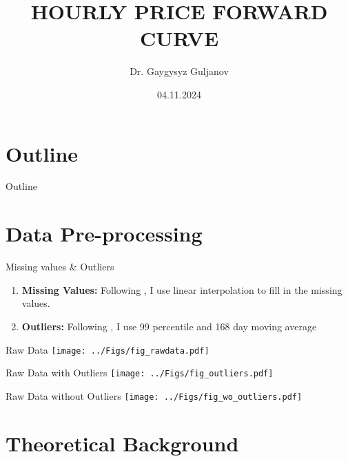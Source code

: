 \documentclass{beamer}
\title{\fontsize{12pt}{15pt} \selectfont HOURLY PRICE FORWARD CURVE}
\author{Dr. Gaygysyz Guljanov}
\institute{University of Münster}
\date{04.11.2024}
\begin{document}
\frame{\titlepage}

\section{Outline}

\begin{frame}{Outline}
    \tableofcontents
\end{frame}


\section{Data Pre-processing}

\begin{frame}{Missing values \& Outliers}
    \begin{enumerate}
        \item \textbf{Missing Values:} Following \cite{SvantessonRastegar-2019}, I use linear interpolation to fill in the missing values.

        \item \textbf{Outliers:} Following \cite{SvantessonRastegar-2019}, I use 99 percentile and 168 day moving average
    \end{enumerate}
\end{frame}


\begin{frame}{Raw Data}
    \texttt{[image: ../Figs/fig\_rawdata.pdf]}
\end{frame}


\begin{frame}{Raw Data with Outliers}
    \texttt{[image: ../Figs/fig\_outliers.pdf]}
\end{frame}


\begin{frame}{Raw Data without Outliers}
    \texttt{[image: ../Figs/fig\_wo\_outliers.pdf]}
\end{frame}



\section{Theoretical Background}
\end{document}
